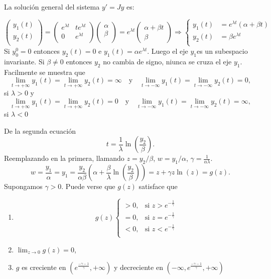 La solución general del sistema $y'=Jy$ es:

\[\begin{pmatrix} y_1(t)\\
    y_2(t) \\
   \end{pmatrix}=
 \begin{pmatrix} e^{\lambda t} & te^{\lambda t} \\
    0 & e^{\lambda t} \\
   \end{pmatrix}
\begin{pmatrix} \alpha\\\beta \\
   \end{pmatrix}=
  e^{\lambda t} \begin{pmatrix} \alpha +\beta t \\
                  \beta 
  \end{pmatrix}
  \Rightarrow \left\{ 
  \begin{array}{ll}
   y_1(t)&= e^{\lambda t}\left(\alpha +\beta t\right)\\
   y_2(t)&= \beta e^{\lambda t}\\
  \end{array}
  \right.
\]
Si $y_0^0=0$ entonces $y_2(t)=0$ e $y_1(t)=\alpha e^{\lambda t}$. Luego el eje $y_1$es un subespacio invariante. Si $\beta\neq 0$ entonces $y_2$ no cambia de signo, niunca se cruza el eje $y_1$.  Facilmente se muestra que 
\[
 \lim_{t\to+\infty}y_1(t)=\lim_{t\to+\infty}y_2(t)=\infty\quad\text{y}\quad \lim_{t\to-\infty}y_1(t)=\lim_{t\to-\infty}y_2(t)=0,
\]
si $\lambda>0$ y 
\[
 \lim_{t\to+\infty}y_1(t)=\lim_{t\to+\infty}y_2(t)=0\quad\text{y}\quad \lim_{t\to-\infty}y_1(t)=\lim_{t\to-\infty}y_2(t)=\infty,
\]
si $\lambda<0$


De la segunda ecuación 
\[
 t=\frac{1}{\lambda}\ln\left(\frac{y_2}{\beta}\right).
\]
Reemplazando en la primera, llamando $z=y_2/\beta$, $w=y_1/\alpha$, $\gamma=\frac{1}{\alpha\lambda}$.
\[
 w=\frac{y_1}{\alpha}=y_1=\frac{y_2}{\alpha\beta}\left(\alpha+\frac{\beta}{\lambda}\ln\left(\frac{y_2}{\beta}\right)\right)=z+\gamma z\ln(z)=g(z).
\]
Supongamos $\gamma>0$. Puede verse que $g(z)$ satisface que
\begin{enumerate}
\item 
\[
 g(z)\left\{
            \begin{array}{ll}
             >0, &\text{si } z>e^{-\frac{1}{\gamma}}\\
             =0, &\text{si } z=e^{-\frac{1}{\gamma}}\\ 
             <0, &\text{si } z<e^{-\frac{1}{\gamma}}\\
            \end{array}
\right.
\]
 
 \item $\lim_{z\to 0}g(z)=0$,
 
 \item $g$ es creciente en $(e^{\frac{- \gamma - 1}{\gamma}},+\infty)$ y decreciente en $(-\infty,e^{\frac{- \gamma - 1}{\gamma}},+\infty)$
\end{enumerate}

